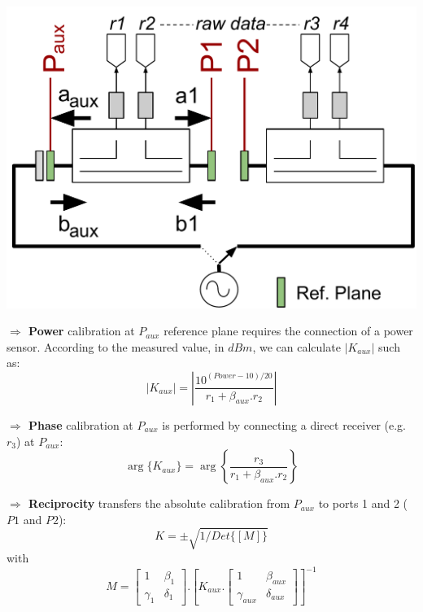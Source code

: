 \documentclass[a0paper,portrait]{baposter}
\begin{document}
\begin{poster}
{\begin{center}
\includegraphics[width=0.7\linewidth]{CALIBRATION.pdf}
\end{center}

\textbf{$\Rightarrow$ Power} calibration at $P_{aux}$ reference plane requires the connection of a power sensor. According to the measured value, in $dBm$, we can calculate $|K_{aux}|$ such as:
\begin{equation*}
|K_{aux}|=\left|{\frac{10^{(Power-10)/20}}{ r_1 + \beta_{aux} . r_2}}\right|
\label{eq:cal_power}
\end{equation*}

\textbf{$\Rightarrow$ Phase} calibration at $P_{aux}$ is performed by connecting a direct receiver (e.g. $r_3$) at $P_{aux}$:
\begin{equation*}
\arg\{K_{aux}\}=\arg\left\{{\frac{r_3}{ r_1 + \beta_{aux} . r_2}}\right\}
\label{eq:cal_phase}
\end{equation*}

\textbf{$\Rightarrow$ Reciprocity} transfers the absolute calibration from $P_{aux}$ to ports 1 and 2 ($P1$ and $P2$):
\begin{equation*}
K=\pm\sqrt{1/Det\{[M]\}}
\label{eq:reciprocity_1}
\end{equation*}
with
\begin{equation*}
M=\begin{bmatrix} 1 & \beta_1  \\  \gamma_1 &  \delta_1 \end{bmatrix}. {\left [ K_{aux}.\begin{bmatrix} 1 & \beta_{aux}  \\  \gamma_{aux} &  \delta_{aux}  \end{bmatrix} \right]}^{-1} 
\label{eq:reciprocity_2}
\end{equation*}
}


\end{poster}
\end{document}
